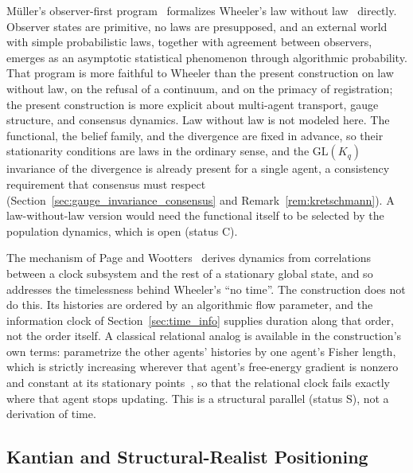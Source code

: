 M{\"u}ller's observer-first program~\cite{Mueller2020} formalizes Wheeler's law without law~\cite{Wheeler1983} directly. Observer states are primitive, no laws are presupposed, and an external world with simple probabilistic laws, together with agreement between observers, emerges as an asymptotic statistical phenomenon through algorithmic probability. That program is more faithful to Wheeler than the present construction on law without law, on the refusal of a continuum, and on the primacy of registration; the present construction is more explicit about multi-agent transport, gauge structure, and consensus dynamics. Law without law is not modeled here. The functional, the belief family, and the divergence are fixed in advance, so their stationarity conditions are laws in the ordinary sense, and the $\mathrm{GL}(K_q)$ invariance of the divergence is already present for a single agent, a consistency requirement that consensus must respect (Section~\ref{sec:gauge_invariance_consensus} and Remark~\ref{rem:kretschmann}). A law-without-law version would need the functional itself to be selected by the population dynamics, which is open (status C).

The mechanism of Page and Wootters~\cite{PageWootters1983} derives dynamics from correlations between a clock subsystem and the rest of a stationary global state, and so addresses the timelessness behind Wheeler's ``no time''. The construction does not do this. Its histories are ordered by an algorithmic flow parameter, and the information clock of Section~\ref{sec:time_info} supplies duration along that order, not the order itself. A classical relational analog is available in the construction's own terms: parametrize the other agents' histories by one agent's Fisher length, which is strictly increasing wherever that agent's free-energy gradient is nonzero and constant at its stationary points~\cite[Ch.~7]{DennisGaugeVFE2026}, so that the relational clock fails exactly where that agent stops updating. This is a structural parallel (status S), not a derivation of time.

\subsection{Kantian and Structural-Realist Positioning}

